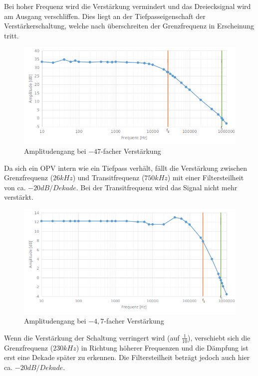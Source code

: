 \documentclass[12pt,a4paper,titlepage]{article}
\begin{document}
\noindent Bei hoher Frequenz wird die Verstärkung vermindert und das Dreiecksignal wird am Ausgang verschliffen. Dies liegt an der Tiefpasseigenschaft der Verstärkerschaltung, welche nach überschreiten der Grenzfrequenz in Erscheinung tritt.

\begin{figure}[H]
  \centering
  \includegraphics[width=150mm]{bode_47.png}
  \caption{Amplitudengang bei $-47$-facher Verstärkung}
\end{figure}

\noindent Da sich ein OPV intern wie ein Tiefpass verhält, fällt die Verstärkung zwischen Grenzfrequenz ($26kHz$) und Transitfrequenz ($750kHz$) mit einer Filtersteilheit von ca. $-20dB/Dekade$. Bei der Transitfrequenz wird das Signal nicht mehr verstärkt.

\begin{figure}[H]
  \centering
  \includegraphics[width=150mm]{bode_4_7.png}
  \caption{Amplitudengang bei $-4,7$-facher Verstärkung}
\end{figure}

\noindent Wenn die Verstärkung der Schaltung verringert wird (auf $\frac{1}{10}$), verschiebt sich die Grenzfrequenz ($230kHz$) in Richtung höherer Frequenzen und die Dämpfung ist erst eine Dekade später zu erkennen. Die Filtersteilheit beträgt jedoch auch hier ca. $-20dB/Dekade$.
\end{document}
